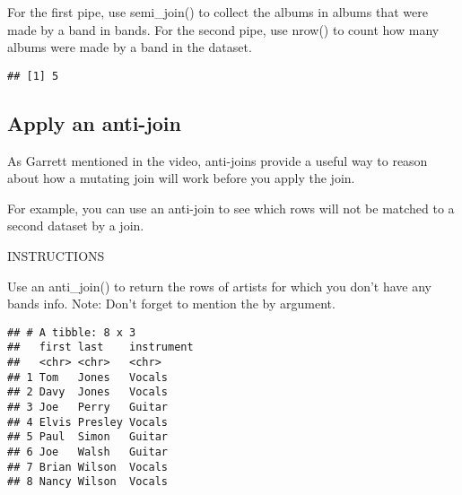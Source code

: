 \documentclass[]{article}
\newenvironment{Shaded}{\begin{snugshade}}{\end{snugshade}}
\newcommand{\KeywordTok}[1]{\textcolor[rgb]{0.13,0.29,0.53}{\textbf{#1}}}
\newcommand{\DataTypeTok}[1]{\textcolor[rgb]{0.13,0.29,0.53}{#1}}
\newcommand{\StringTok}[1]{\textcolor[rgb]{0.31,0.60,0.02}{#1}}
\newcommand{\CommentTok}[1]{\textcolor[rgb]{0.56,0.35,0.01}{\textit{#1}}}
\newcommand{\OperatorTok}[1]{\textcolor[rgb]{0.81,0.36,0.00}{\textbf{#1}}}
\newcommand{\NormalTok}[1]{#1}
\begin{document}
For the first pipe, use semi\_join() to collect the albums in albums
that were made by a band in bands. For the second pipe, use nrow() to
count how many albums were made by a band in the dataset.

\begin{Shaded}
\end{Shaded}

\begin{verbatim}
## [1] 5
\end{verbatim}

\subsection{Apply an anti-join}\label{apply-an-anti-join}

As Garrett mentioned in the video, anti-joins provide a useful way to
reason about how a mutating join will work before you apply the join.

For example, you can use an anti-join to see which rows will not be
matched to a second dataset by a join.

INSTRUCTIONS

Use an anti\_join() to return the rows of artists for which you don't
have any bands info. Note: Don't forget to mention the by argument.

\begin{Shaded}
\end{Shaded}

\begin{verbatim}
## # A tibble: 8 x 3
##   first last    instrument
##   <chr> <chr>   <chr>     
## 1 Tom   Jones   Vocals    
## 2 Davy  Jones   Vocals    
## 3 Joe   Perry   Guitar    
## 4 Elvis Presley Vocals    
## 5 Paul  Simon   Guitar    
## 6 Joe   Walsh   Guitar    
## 7 Brian Wilson  Vocals    
## 8 Nancy Wilson  Vocals
\end{verbatim}
\end{document}
